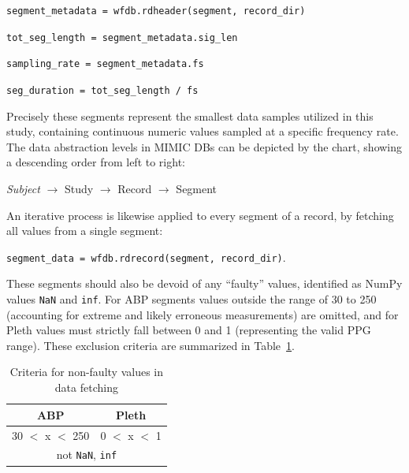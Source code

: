 \vspace{0.1cm}
\qquad\qquad\qquad \texttt{segment\_metadata = wfdb.rdheader(segment, record\_dir)}

\qquad\qquad\qquad \texttt{tot\_seg\_length = segment\_metadata.sig\_len}

\qquad\qquad\qquad \texttt{sampling\_rate = segment\_metadata.fs}

\qquad\qquad\qquad \texttt{seg\_duration = tot\_seg\_length / fs}
\vspace{0.1cm}

\noindent Precisely these segments represent the smallest data samples utilized in this study, containing continuous numeric values sampled at a specific frequency rate.
The data abstraction levels in MIMIC DBs can be depicted by the chart, showing a descending order from left to right:

\vspace{0.1cm}
{\centering \textit{Subject} $\rightarrow$ Study $\rightarrow$ Record $\rightarrow$ Segment\par}
\vspace{0.1cm}

An iterative process is likewise applied to every segment of a record, by fetching all values from a single segment:

\vspace{0.1cm}
{\centering \texttt{segment\_data = wfdb.rdrecord(segment, record\_dir)}.\par}
\vspace{0.1cm}

\noindent These segments should also be devoid of any \enquote{faulty} values, identified as NumPy values \texttt{NaN} and \texttt{inf}.
For ABP segments values outside the range of 30 to 250 (accounting for extreme and likely erroneous measurements) are omitted, and for Pleth values must strictly fall between 0 and 1 (representing the valid PPG range).
These exclusion criteria are summarized in Table~\ref{tab:faulty}.

\begin{table}
    \begin{center}
        \begin{tabular}{ |c|c| }
            \hline
            ABP              & Pleth         \\
            \hline
            30 $<$ x $<$ 250 & 0 $<$ x $<$ 1 \\
            \hline
            \multicolumn{2}{|c|}{not \texttt{NaN}, \texttt{inf}} \\
            \hline
        \end{tabular}
    \end{center}
    \vspace*{-7mm}
    \captionsetup{format=plain, justification=centering}
    \caption{\small Criteria for non-faulty values in data fetching}
    \label{tab:faulty}
\end{table}

